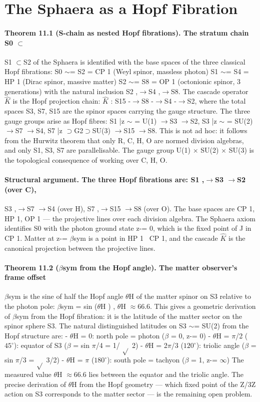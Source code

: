 \section{The Sphaera as a Hopf Fibration}
\paragraph*{Theorem 11.1 (S-chain as nested Hopf fibrations). The stratum chain S0 $\subset$}
S1 $\subset$S2 of the Sphaera is identified with the base spaces of the three classical Hopf fibrations: S0 $\sim$= S2 = CP 1 (Weyl spinor, massless photon) S1 $\sim$= S4 = HP 1 (Dirac spinor, massive matter) S2 $\sim$= S8 = OP 1 (octonionic spinor, 3 generations) with the natural inclusion S2 ,$\to$S4 ,$\to$S8. The cascade operator $\hat K$ is the Hopf projection chain: $\hat K$ : S15 -$\to$S8 -$\to$S4 -$\to$S2, where the total spaces S3, S7, S15 are the spinor spaces carrying the gauge structure. The three gauge groups arise as Hopf fibres: S1 |{z} $\sim$ = U(1) $\to$S3 $\to$S2, S3 |{z} $\sim$ = SU(2) $\to$S7 $\to$S4, S7 |{z} $\supset$G2$\supset$SU(3) $\to$S15 $\to$S8. This is not ad hoc: it follows from the Hurwitz theorem that only R, C, H, O are normed division algebras, and only S1, S3, S7 are parallelisable. The gauge group U(1) $\times$ SU(2) $\times$ SU(3) is the topological consequence of working over C, H, O.
\paragraph*{Structural argument. The three Hopf fibrations are: S1 ,$\to$S3 $\to$S2 (over C),}
S3 ,$\to$S7 $\to$S4 (over H), S7 ,$\to$S15 $\to$S8 (over O). The base spaces are CP 1, HP 1, OP 1 --- the projective lines over each division algebra. The Sphaera axiom identifies S0 with the photon ground state z-= 0, which is the fixed point of J in CP 1. Matter at z-= $\beta$sym is a point in HP 1 \ CP 1, and the cascade $\hat K$ is the canonical projection between the projective lines.
\paragraph*{Theorem 11.2 ($\beta$sym from the Hopf angle). The matter observer's frame offset}
$\beta$sym is the sine of half the Hopf angle $\theta$H of the matter spinor on S3 relative to the photon pole: $\beta$sym = sin ($\theta$H ) , $\theta$H $\approx$66.6. This gives a geometric derivation of $\beta$sym from the Hopf fibration: it is the latitude of the matter sector on the spinor sphere S3. The natural distinguished latitudes on S3 $\sim$= SU(2) from the Hopf structure are:
- $\theta$H = 0: north pole = photon ($\beta$ = 0, z-= 0)
- $\theta$H = $\pi$/2 ($45^\circ$): equator of S3 ($\beta$ = sin $\pi$/4 = 1/
$\sqrt{}$ 2)
- $\theta$H = 2$\pi$/3 ($120^\circ$): triolic angle ($\beta$ = sin $\pi$/3 =
$\sqrt{}$ 3/2)
- $\theta$H = $\pi$ ($180^\circ$): south pole = tachyon ($\beta$ = 1, z-= $\infty$)
The measured value $\theta$H $\approx$66.6 lies between the equator and the triolic angle. The precise derivation of $\theta$H from the Hopf geometry --- which fixed point of the Z/3Z action on S3 corresponds to the matter sector --- is the remaining open problem.
